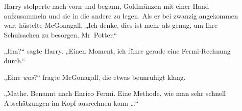 

Harry stolperte nach vorn und begann, Goldmünzen mit einer Hand aufzusammeln und sie in die andere zu legen. Als er bei zwanzig angekommen war, hüstelte McGonagall.
„Ich denke, dies ist mehr als genug, um Ihre Schulsachen zu besorgen, Mr~Potter.“

„Hm?“ sagte Harry.
„Einen Moment, ich führe gerade eine Fermi-Rechnung durch.“

„Eine \emph{was}?“ fragte McGonagall, die etwas beunruhigt klang.

„Mathe. Benannt nach Enrico Fermi. Eine Methode, wie man sehr schnell Abschätzungen im Kopf ausrechnen kann …“

